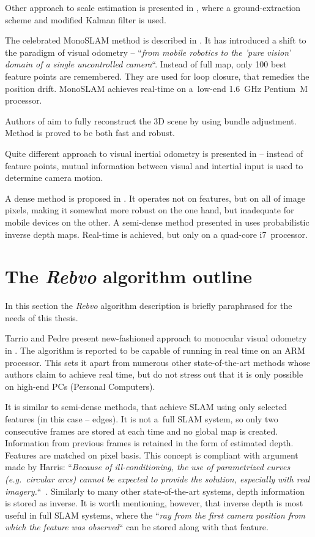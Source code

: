 Other approach to scale estimation is presented in \cite{xiao2015novel}, where a ground-extraction scheme and modified Kalman filter is used.

The celebrated MonoSLAM method is described in \cite{monoslam}. It has introduced a shift to the paradigm of visual odometry -- ``\textit{from mobile robotics to the 'pure vision' domain of a single uncontrolled camera}``. Instead of full map, only 100 best feature points are remembered. They are used for loop closure, that remedies the position drift. MonoSLAM achieves real-time on a~low-end 1.6~GHz Pentium~M processor.


Authors of \cite{mouragnon2006real} aim to fully reconstruct the 3D scene by using bundle adjustment. Method is proved to be both fast and robust.

Quite different approach to visual inertial odometry is presented in \cite{gui2015robust} -- instead of feature points, mutual information between visual and intertial input is used to determine camera motion.

A dense method is proposed in \cite{robust_visual_odometry_estimation}. It operates not on features, but on all of image pixels, making it somewhat more robust on the one hand, but inadequate for mobile devices on the other. A semi-dense method presented in \cite{semi_dense} uses probabilistic inverse depth maps. Real-time is achieved, but only on a quad-core i7~processor.



\section{The \textit{Rebvo} algorithm outline}
\label{sec:rebvo_outline}

In this section the \textit{Rebvo} algorithm description is briefly paraphrased for the needs of this thesis.

Tarrio and Pedre present new-fashioned approach to monocular visual odometry in \cite{jose2015realtime}. The algorithm is reported to be capable of running in real time on an ARM processor. This sets it apart from numerous other state-of-the-art methods whose authors claim to achieve real time, but do not stress out that it is only possible on high-end PCs (Personal Computers).

It is similar to semi-dense methods, that achieve SLAM using only selected features (in this case -- edges). It is not a~full SLAM system, so only two consecutive frames are stored at each time and no global map is created. Information from previous frames is retained in the form of estimated depth. Features are matched on pixel basis. This concept is compliant with argument made by Harris: ``\textit{Because of ill-conditioning, the use of parametrized curves (e.g.~circular arcs) cannot be expected to provide the solution, especially with real imagery.}``~\cite{harris}. Similarly to many other state-of-the-art systems, depth information is stored as inverse. It is worth mentioning, however, that inverse depth is most useful in full SLAM systems, where the ``\textit{ray from the first camera position from which the feature was observed}`` \cite{civera2008inverse} can be stored along with that feature.


